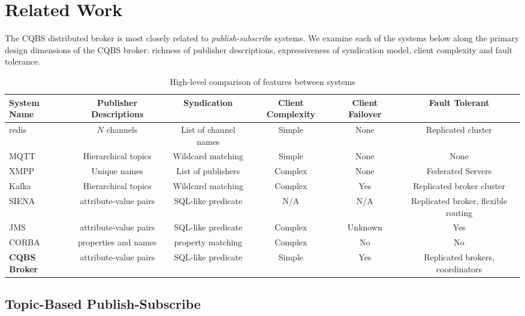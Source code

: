 \section{Related Work}
\label{section:relatedwork}

The CQBS distributed broker is most closely related to \emph{publish-subscribe} systems.
We examine each of the systems below along the primary design dimensions of the CQBS broker: richness of publisher descriptions, expressiveness of syndication model, client complexity and fault tolerance.

\begin{table*}
\caption{High-level comparison of features between systems}
\label{table:comparison}
\centering
\begin{tabular}{|l|c|c|c|c|c|}
\hline
\textbf{System Name} & \textbf{Publisher Descriptions} & \textbf{Syndication} & \textbf{Client Complexity} & \textbf{Client Failover} & \textbf{Fault Tolerant} \\
\hline \hline
redis~\cite{redis} & $N$ channels & List of channel names & Simple & None & Replicated cluster \\
MQTT~\cite{locke2010mq}\cite{hunkeler2008mqtt} & Hierarchical topics & Wildcard matching & Simple & None & None \\
XMPP~\cite{saint2011extensible} & Unique names & List of publishers & Complex & None & Federated Servers \\
Kafka~\cite{kreps2011kafka} & Hierarchical topics & Wildcard matching & Complex & Yes & Replicated broker cluster \\
SIENA~\cite{carzaniga2000achieving} & attribute-value pairs & SQL-like predicate & N/A & N/A & Replicated broker, flexible routing \\
JMS~\cite{hapner2002java} & attribute-value pairs & SQL-like predicate & Complex & Unknown & Yes \\
CORBA~\cite{vinoski1997corba} & properties and names & property matching & Complex & No & No \\
\textbf{CQBS Broker} & attribute-value pairs & SQL-like predicate & Simple & Yes & Replicated brokers, coordinators \\
\hline
\end{tabular}
\end{table*}

\subsection{Topic-Based Publish-Subscribe}

